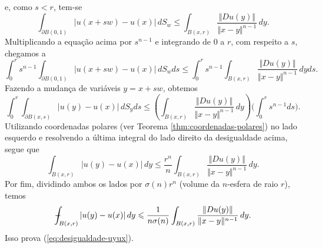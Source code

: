 \begin{prf}
\[    \]
    e, como $s < r$, tem-se
    \[
        \int_{\partial B(0,1)} |u(x + sw) - u(x)|\,dS_w \leqslant   \int_{B(x,r)} \frac{\Vert Du(y) \Vert}{\Vert x - y \Vert^{n-1}} \,dy.
    \]
    Multiplicando a equação acima por $s^{n-1}$ e integrando de $0$ a $r$, com respeito a $s$, chegamos a
    \[
        \int_0^r s^{n-1} \int_{\partial B(0,1)} |u(x + sw) - u(x)| \,dS_wds \leqslant \int_0^r s^{n-1} \int_{B(x,r)} \frac{\Vert Du(y) \Vert}{\Vert x - y \Vert^{n-1}} \,dyds.
    \]
    Fazendo a mudança de variáveis $y = x + sw$, obtemos
    \[
        \int_0^r \int_{\partial B(x,s)} |u(y) - u(x)|\, dS_yds \leqslant \left( \int_{B(x,r)} \frac{\Vert Du(y) \Vert}{\Vert x - y \Vert^{n-1}} \,dy \right) \bigg( \int_0^r s^{n-1} ds \bigg).
    \]
    Utilizando coordenadas polares (ver Teorema \ref{thm:coordenadas-polares}) no lado esquerdo e resolvendo a última integral do lado direito da desigualdade acima, segue que
    \[
        \int_{B(x,r)} |u(y) - u(x)|\,dy \leqslant \frac{r^n}{n} \int_{B(x,r)} \frac{\Vert Du(y) \Vert}{\Vert x - y \Vert^{n-1}} \,dy.
    \]
    Por fim, dividindo ambos os lados por $\sigma(n) r^n$ (volume da $n$-esfera de raio $r$), temos
    \[
        -\!\!\!\!\!\!\int_{B(x,r)} |u(y) - u(x)| \,dy \leqslant \frac{1}{n\sigma(n)} \int_{B(x,r)} \frac{\Vert Du(y) \Vert}{\Vert x-y \Vert^{n-1}} \,dy.
    \]
    Isso prova (\ref{eq:desigualdade-uyux}).


\end{prf}
